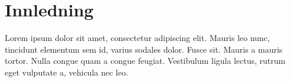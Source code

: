 \section{Innledning}
Lorem ipsum dolor sit amet, consectetur adipiscing elit. Mauris leo nunc, tincidunt elementum sem id, varius sodales dolor. Fusce sit.
Mauris a mauris tortor. Nulla congue quam a congue feugiat. Vestibulum ligula lectus, rutrum eget vulputate a, vehicula nec leo.


